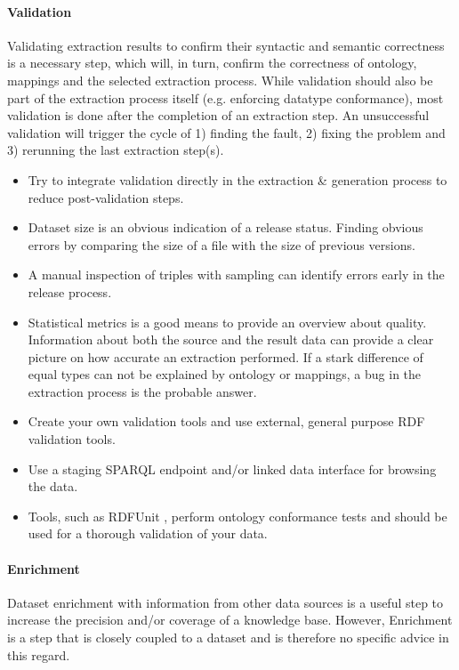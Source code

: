 \documentclass[a4paper,english,twoside,BCOR1.5cm,headsepline,DIV12,appendixprefix,final,12pt]{scrbook}
\begin{document}
\vspace{-1.5em}
\paragraph{Validation}
Validating extraction results to confirm their syntactic and semantic correctness is a necessary step, which will, in turn, confirm the correctness of ontology, mappings and the selected extraction process.
While validation should also be part of the extraction process itself (e.g. enforcing datatype conformance), most validation is done after the completion of an extraction step. An unsuccessful validation will trigger the cycle of 1) finding the fault, 2) fixing the problem and 3) rerunning the last extraction step(s).

\begin{itemize}
\itemsep0em 
\item Try to integrate validation directly in the extraction \& generation process to reduce post-validation steps.
\item Dataset size is an obvious indication of a release status. Finding obvious errors by comparing the size of a file with the size of previous versions.
\item A manual inspection of triples with sampling can identify errors early in the release process. 
\item Statistical metrics is a good means to provide an overview about quality. Information about both the source and the result data can provide a clear picture on how accurate an extraction performed. If a stark difference of equal types can not be explained by ontology or mappings, a bug in the extraction process is the probable answer. 
\item Create your own validation tools and use external, general purpose RDF validation tools.
\item Use a staging SPARQL endpoint and/or linked data interface for browsing the data.
\item Tools, such as RDFUnit \cite{rdfunit}, perform ontology conformance tests and should be used for a thorough validation of your data.
\end{itemize}

\vspace{-1.5em}
\paragraph{Enrichment}
Dataset enrichment with information from other data sources is a useful step to increase the precision and/or coverage of a knowledge base.
However, Enrichment is a step that is closely coupled to a dataset and is therefore no specific advice in this regard.
\end{document}
